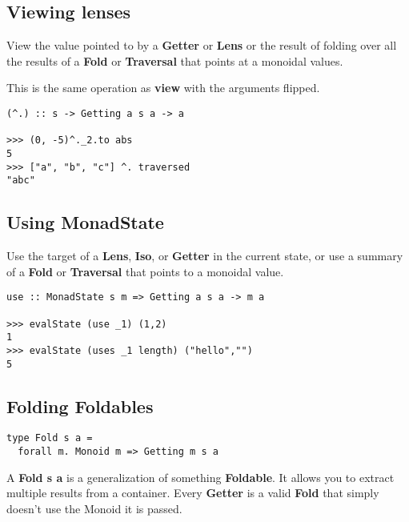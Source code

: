 \begin{multicols}{2}
\begin{box1}

\subsection *{Viewing lenses}

View the value pointed to by a \textbf{Getter} or \textbf{Lens} or the result
of folding over all the results of a \textbf{Fold} or \textbf{Traversal} that
points at a monoidal values.

This is the same operation as \textbf{view} with the arguments flipped.

\begin{verbatim}
(^.) :: s -> Getting a s a -> a 

>>> (0, -5)^._2.to abs
5
>>> ["a", "b", "c"] ^. traversed
"abc"
\end{verbatim}
\end{box1}

\begin{box2}
\subsection*{Using MonadState}

Use the target of a \textbf{Lens}, \textbf{Iso}, or \textbf{Getter} in the
current state, or use a summary of a \textbf{Fold} or \textbf{Traversal} that
points to a monoidal value.

\begin{verbatim}
use :: MonadState s m => Getting a s a -> m a

>>> evalState (use _1) (1,2)
1
>>> evalState (uses _1 length) ("hello","")
5
\end{verbatim}
\end{box2}

\columnbreak

\begin{box1}
\subsection *{Folding Foldables}
\begin{verbatim}
type Fold s a =
  forall m. Monoid m => Getting m s a
\end{verbatim}
A \textbf{Fold s a} is a generalization of something \textbf{Foldable}. It
allows you to extract multiple results from a container. Every \textbf{Getter}
is a valid \textbf{Fold} that simply doesn't use the Monoid it is passed.


\end{box1}
\end{multicols}
